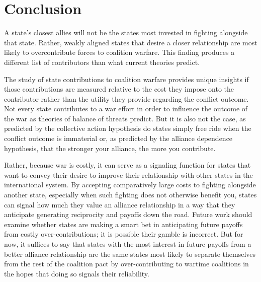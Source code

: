 \documentclass[12pt,letterpaper]{article}
\begin{document}
\section{Conclusion}
	A state's closest allies will not be the states most invested in fighting alongside that state. Rather, weakly aligned states that desire a closer relationship are most likely to overcontribute forces to coalition warfare. This finding produces a different list of contributors than what current theories predict.
	
	The study of state contributions to coalition warfare provides unique insights if those contributions are measured relative to the cost they impose onto the contributor rather than the utility they provide regarding the conflict outcome. Not every state contributes to a war effort in order to influence the outcome of the war as theories of balance of threats predict. But it is also not the case, as predicted by the collective action hypothesis do states simply free ride when the conflict outcome is immaterial or, as predicted by the alliance dependence hypothesis, that the stronger your alliance, the more you contribute.

	Rather, because war is costly, it can serve as a signaling function for states that want to convey their desire to improve their relationship with other states in the international system. By accepting comparatively large costs to fighting alongside another state, especially when such fighting does not otherwise benefit you, states can signal how much they value an alliance relationship in a way that they anticipate generating reciprocity and payoffs down the road. Future work should examine whether states are making a smart bet in anticipating future payoffs from costly over-contributions; it is possible their gamble is incorrect. But for now, it suffices to say that states with the most interest in future payoffs from a better alliance relationship are the same states most likely to separate themselves from the rest of the coalition pact by over-contributing to wartime coalitions in the hopes that doing so signals their reliability.



\end{document}

